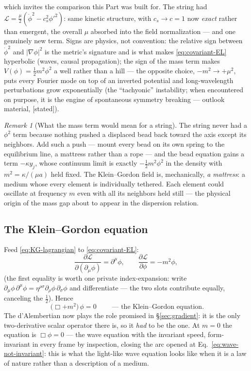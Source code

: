 \documentclass[11pt]{article}
\theoremstyle{plain}
\theoremstyle{definition}
\theoremstyle{remark}
\newtheorem{remark}[theorem]{Remark}
\newcommand{\pd}[2]{\frac{\partial #1}{\partial #2}}
\begin{document}
which invites the comparison this Part was built for. The string had
$\mathcal L = \tfrac{\mu}{2}(\dot\phi^2 - c_s^2\phi'^2)$: same kinetic
structure, with $c_s \to c = 1$ now \emph{exact} rather than emergent,
the overall $\mu$ absorbed into the field normalization --- and one
genuinely new term. Signs are physics, not convention: the relative
sign between $\dot\phi^2$ and $|\nabla\phi|^2$ is the metric's
signature and is what makes \eqref{eq:covariant-EL} hyperbolic
(waves, causal propagation); the sign of the mass term makes
$V(\phi) = \tfrac12 m^2\phi^2$ a well rather than a hill --- the
opposite choice, $-m^2 \to +\mu^2$, puts every Fourier mode on top of
an inverted potential and long-wavelength perturbations grow
exponentially (the ``tachyonic'' instability; when encountered on
purpose, it is the engine of spontaneous symmetry breaking ---
outlook material, [stated]).

\begin{remark}[What the mass term would mean for a string]
\label{rem:mattress}
The string never had a $\phi^2$ term because nothing pushed a
displaced bead back toward the axis except its neighbors. Add such a
push --- mount every bead on its own spring to the equilibrium line,
a mattress rather than a rope --- and the bead equation gains a term
$-\kappa y_j$, whose continuum limit is exactly
$-\tfrac12 m^2\phi^2$ in the density with $m^2 = \kappa/(\mu a)$
held fixed. The Klein--Gordon field is, mechanically, \emph{a
mattress}: a medium whose every element is individually tethered.
Each element could oscillate at frequency $m$ even with all its
neighbors held still --- the physical origin of the mass gap about to
appear in the dispersion relation.
\end{remark}

\subsection{The Klein--Gordon equation}
\label{sec:KG-equation}

Feed \eqref{eq:KG-lagrangian} to \eqref{eq:covariant-EL}:
\begin{equation}
  \pd{\mathcal L}{(\partial_\mu\phi)} = \partial^\mu\phi,
  \qquad
  \pd{\mathcal L}{\phi} = -m^2\phi,
\end{equation}
(the first equality is worth one private index-expansion: write
$\partial_\mu\phi\,\partial^\mu\phi =
\eta^{\rho\sigma}\partial_\rho\phi\,\partial_\sigma\phi$ and
differentiate --- the two slots contribute equally, canceling the
$\tfrac12$). Hence
\begin{equation}
  \boxed{\;
  \bigl(\Box + m^2\bigr)\,\phi = 0
  \;}
  \qquad\text{--- the Klein--Gordon equation.}
  \label{eq:KG}
\end{equation}
The d'Alembertian now plays the role promised in
\S\ref{sec:gradient}: it is the only two-derivative scalar operator
there is, so it \emph{had} to be the one. At $m = 0$ the equation is
$\Box\phi = 0$ --- the wave equation with the invariant speed,
form-invariant in every frame by inspection, closing the arc opened at
Eq.~\eqref{eq:wave-not-invariant}: this is what the light-like wave
equation looks like when it is a law of nature rather than a
description of a medium.
\end{document}
